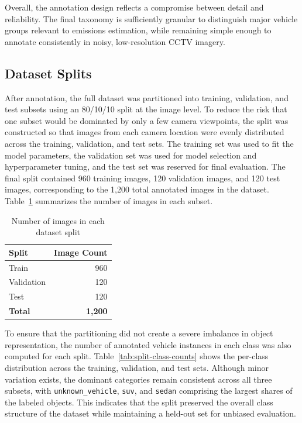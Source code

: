 Overall, the annotation design reflects a compromise between detail and reliability.
The final taxonomy is sufficiently granular to distinguish major vehicle groups 
relevant to emissions estimation, while remaining simple enough to annotate 
consistently in noisy, low-resolution CCTV imagery.

\subsection{Dataset Splits}
\label{sec:data-splits}

After annotation, the full dataset was partitioned into training, validation, and
test subsets using an 80/10/10 split at the image level. To reduce the risk that
one subset would be dominated by only a few camera viewpoints, the split was 
constructed so that images from each camera location were evenly distributed across the 
training, validation, and test sets. The training set was used to fit the model 
parameters, the validation set was used for model selection and hyperparameter 
tuning, and the test set was reserved for final evaluation.  The final split 
contained 960 training images, 120 validation images, and 120 test images, 
corresponding to the 1,200 total annotated images in the dataset. 
Table~\ref{tab:split_image_counts} summarizes the number of images in each subset.

\begin{table}[!htbp]
    \centering
    \caption{Number of images in each dataset split}
    \label{tab:split_image_counts}
    \begin{tabular}{lr}
        \toprule
        \textbf{Split} & \textbf{Image Count} \\
        \midrule
        Train      & 960 \\
        Validation & 120 \\
        Test       & 120 \\
        \midrule
        \textbf{Total} & \textbf{1,200} \\
        \bottomrule
    \end{tabular}
\end{table}

\FloatBarrier

To ensure that the partitioning did not create a severe imbalance in object
representation, the number of annotated vehicle instances in each class was also
computed for each split. Table~\ref{tab:split-class-counts} shows the per-class
distribution across the training, validation, and test sets. Although minor
variation exists, the dominant categories remain consistent across all three
subsets, with \verb|unknown_vehicle|, \verb|suv|, and \verb|sedan| comprising the
largest shares of the labeled objects. This indicates that the split preserved the
overall class structure of the dataset while maintaining a held-out set for unbiased
evaluation.


